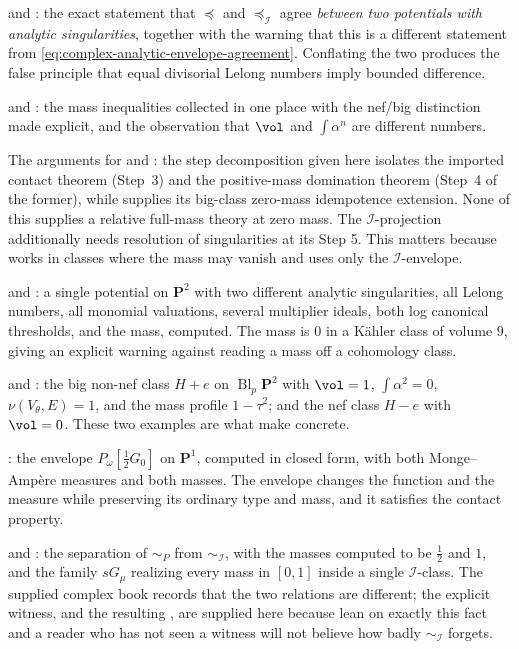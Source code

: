  and : the exact
statement that $\preceq$ and $\preceq_{\mathcal I}$ agree
\emph{between two potentials with analytic singularities}, together with
the warning that this is a different statement from
\eqref{eq:complex-analytic-envelope-agreement}.  Conflating the two
produces the false principle that equal divisorial Lelong numbers imply
bounded difference.

 and
: the mass inequalities collected
in one place with the nef/big distinction made explicit, and the
observation that $\vol$ and $\int\alpha^n$ are different numbers.

The arguments for  and
: the step decomposition given here
isolates the imported contact theorem (Step~3) and the positive-mass
domination theorem (Step~4 of the former), while \cite[Theorem~1.2]{PSWZ26} supplies its big-class
zero-mass idempotence extension.  None of this supplies a relative
full-mass theory at zero mass.  The $\mathcal I$-projection additionally
needs resolution of singularities at its Step 5.  This matters because
 works in classes where the mass may
vanish and uses only the $\mathcal I$-envelope.

 and : a single potential
on $\mathbf P^2$ with two different analytic singularities, all Lelong
numbers, all monomial valuations, several multiplier ideals, both log
canonical thresholds, and the mass, computed.  The mass is $0$ in a
K\"ahler class of volume $9$, giving an explicit warning against
reading a mass off a cohomology class.

 and : the
big non-nef class $H+e$ on $\operatorname{Bl}_p\mathbf P^2$ with
$\vol=1$, $\int\alpha^2=0$, $\nu(V_\theta,E)=1$, and the mass
profile $1-\tau^2$; and the nef class $H-e$ with $\vol=0$.  These
two examples are what make  concrete.

: the envelope $P_\omega[\frac12G_0]$ on
$\mathbf P^1$, computed in closed form, with both Monge--Amp\`ere
measures and both masses.  The envelope changes the function and the
measure while preserving its ordinary type and mass, and it satisfies
the contact property.

 and : the separation of
$\sim_P$ from $\sim_{\mathcal I}$, with the masses computed to be
$\frac12$ and $1$, and the family $sG_\mu$ realizing every mass in
$[0,1]$ inside a single $\mathcal I$-class.  The supplied complex
book records that the two relations are different; the explicit witness,
and the resulting , are supplied here
because  lean on
exactly this fact and a reader who has not seen a witness will not
believe how badly $\sim_{\mathcal I}$ forgets.

